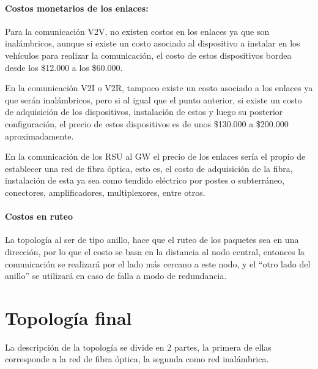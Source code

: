 \documentclass[12pt]{article}
\begin{document}
\paragraph{Costos monetarios de los enlaces:\\}
Para la comunicación V2V, no existen costos en los enlaces ya que son inalámbricos, aunque si 
existe un costo asociado al dispositivo a instalar en los vehículos para realizar la comunicación, el 
costo de estos dispositivos bordea desde los \$12.000 a los \$60.000.

En la comunicación V2I o V2R, tampoco existe un costo asociado a los enlaces ya que serán inalámbricos, 
pero si al igual que el punto anterior, si existe un costo de adquisición de los dispositivos, 
instalación de estos y luego su posterior configuración, el precio de estos dispositivos es de unos 
\$130.000 a \$200.000 aproximadamente.

En la comunicación de los RSU al GW el precio de los enlaces sería el propio de establecer una red de 
fibra óptica, esto es, el costo de adquisición de la fibra, instalación de esta ya sea como tendido 
eléctrico por postes o subterráneo, conectores, amplificadores, multiplexores, entre otros.

\paragraph{Costos en ruteo}

La topología al ser de tipo anillo, hace que el ruteo de los paquetes sea en una dirección, por lo que 
el costo se basa en la distancia al nodo central, entonces la comunicación se realizará por el lado más 
cercano a este nodo, y el ``otro lado del anillo'' se utilizará en caso de falla a modo de redundancia.\\ 

\newpage
\section{Topología final}
La descripción de la topología se divide en 2 partes, la primera de ellas corresponde a la red de fibra 
óptica, la segunda como red inalámbrica.
\end{document}
